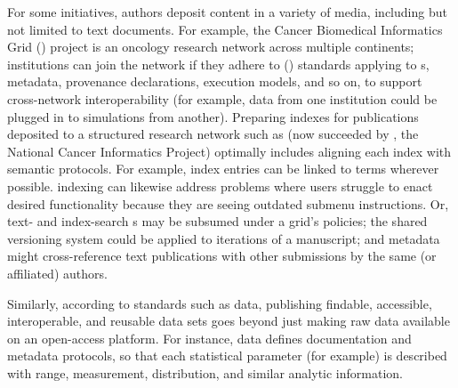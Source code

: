 \documentclass[11pt]{article}
\begin{document}
{{\begin{description}
\clearpage{}

\item[Indexing Digital/Multimedia Repositories]  For 
some initiatives, authors deposit content in a 
variety of media, including but not limited to 
text documents.  For example, the 
Cancer Biomedical Informatics Grid (\CaBIG{}) 
project is an oncology research network 
across multiple continents; institutions can join 
the network if they adhere to  
(\VCDE{}) standards applying to \API{}s, metadata, provenance 
declarations, execution models, and so on, to 
support cross-network interoperability 
(for example, data from one institution could be 
plugged in to simulations from another).  Preparing 
indexes for publications deposited to 
a structured research network such as \CaBIG{} 
(now succeeded by \NCIP{}, the National Cancer Informatics 
Project) optimally includes aligning each 
index with semantic protocols.  For example, index 
entries can be linked to \VCDE{} terms wherever 
possible.  \lGUI{} indexing can likewise address 
problems where users struggle to enact desired functionality because 
they are seeing outdated 
submenu instructions. 
Or, text- and index-search \API{}s 
may be subsumed under a grid's \API{} 
policies; the shared versioning system could be 
applied to iterations of a manuscript; and 
metadata might cross-reference text publications 
with other submissions by the same (or affiliated) authors.  

\pseudoIndent{}  Similarly, according to standards such as 
\FAIR{}data, publishing findable, accessible, 
interoperable, and reusable data sets goes beyond 
just making raw data available on an open-access platform.  
For instance, \FAIR{}data defines documentation and metadata 
protocols, so that each statistical parameter (for example) 
is described with range, measurement, distribution, and 
similar analytic information. 


\end{description}}}
\end{document}

